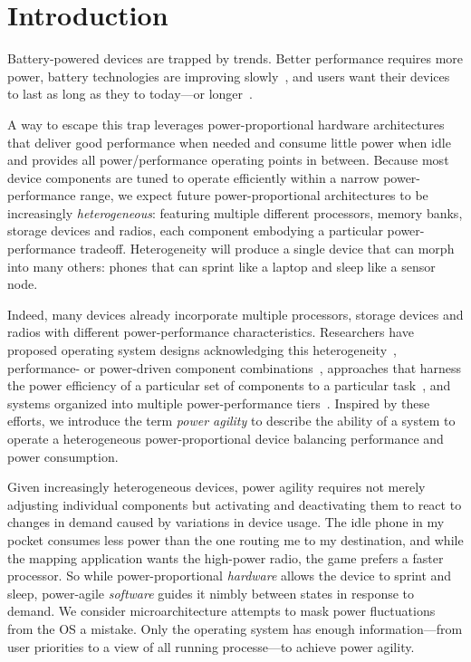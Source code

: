 \section{Introduction}

Battery-powered devices are trapped by trends. Better performance requires more
power, battery technologies are improving
slowly~\cite{economist-batteryhistory}, and users want their devices to last as
long as they to today---or longer~\cite{informationweek-batteries}.

A way to escape this trap leverages power-proportional hardware
architectures~\cite{barroso-energyproportional} that deliver good performance
when needed and consume little power when idle and provides all power/performance operating points in between. Because most device
components are tuned to operate efficiently within a narrow power-performance
range, we expect future power-proportional architectures to be increasingly
\textit{heterogeneous}: featuring multiple different processors, memory
banks, storage devices and radios, each component embodying a particular
power-performance tradeoff. Heterogeneity will produce a single device that
can morph into many others: phones that can sprint like a laptop and sleep
like a sensor node.

Indeed, many devices already incorporate multiple processors, storage devices
and radios with different power-performance characteristics. 
Researchers have proposed operating system designs acknowledging this
heterogeneity~\cite{baumann-barrelfish}, performance- or power-driven
component combinations~\cite{mogul-hybridnvmdram,aruna-3Gwifi}, approaches
that harness the power efficiency of a particular set of components to a
particular task~\cite{andersen-fawn,szalay-amdahl}, and systems organized
into multiple power-performance tiers~\cite{sorber-turducken}. Inspired by
these efforts, we introduce the term \textit{power agility} to describe the
ability of a system to operate a heterogeneous power-proportional device
balancing performance and power consumption.

Given increasingly heterogeneous devices, power agility requires not merely
adjusting individual components but activating and deactivating them to react
to changes in demand caused by variations in device usage. The idle phone in
my pocket consumes less power than the one routing me to my destination, and
while the mapping application wants the high-power radio, the game prefers a
faster processor. So while power-proportional \textit{hardware} allows the
device to sprint and sleep, power-agile \textit{software} guides it nimbly
between states in response to demand. We consider microarchitecture attempts to mask power
fluctuations~\cite{rangan-hpca11} from the OS a mistake. Only the operating system has
enough information---from user priorities to a view of all running processe---to achieve power agility.

